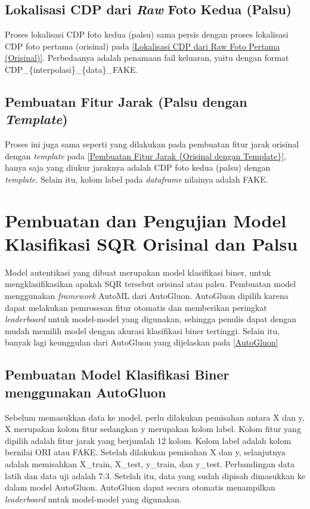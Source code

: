 \subsection{Lokalisasi CDP dari \emph{Raw} Foto Kedua (Palsu)} Proses lokalisasi CDP foto kedua (palsu) sama persis dengan proses lokalisasi CDP foto pertama (orisinal) pada \ref{Lokalisasi CDP dari Raw
	Foto Pertama (Orisinal)}. Perbedaanya adalah penamaan fail keluaran, yaitu dengan format CDP\_\{interpolasi\}\_\{data\}\_FAKE.

\subsection{Pembuatan Fitur Jarak (Palsu dengan \emph{Template})}
Proses ini juga sama seperti yang dilakukan pada pembuatan fitur jarak orisinal dengan \emph{template} pada \ref{Pembuatan Fitur Jarak {Orisinal dengan
			Template}}, hanya saja yang diukur jaraknya adalah CDP foto kedua (palsu) dengan \emph{template}. Selain itu, kolom label pada \emph{dataframe} nilainya adalah
FAKE.

\section{Pembuatan dan Pengujian Model Klasifikasi SQR Orisinal dan Palsu}
Model autentikasi yang dibuat merupakan model klasifikasi biner, untuk mengklasifikasikan apakah SQR tersebut orisinal atau palsu. Pembuatan model menggunakan
\emph{framework} AutoML dari AutoGluon. AutoGluon dipilih karena dapat melakukan pemrosesan fitur otomatis dan memberikan peringkat \emph{leaderboard} untuk
model-model yang digunakan, sehingga penulis dapat dengan mudah memilih model dengan akurasi klasifikasi biner tertinggi. Selain itu, banyak lagi keunggulan
dari AutoGluon yang dijelaskan pada \ref{AutoGluon}

\subsection{Pembuatan Model Klasifikasi Biner menggunakan AutoGluon}
Sebelum memasukkan data ke model, perlu dilakukan pemisahan antara X dan y, X merupakan kolom fitur sedangkan y merupakan kolom label. Kolom fitur yang dipilih
adalah fitur jarak yang berjumlah 12 kolom. Kolom label adalah kolom bernilai ORI atau FAKE. Setelah dilakukan pemisahan X dan y, selanjutnya adalah memisahkan
X\_train, X\_test, y\_train, dan y\_test. Perbandingan data latih dan data uji adalah 7:3. Setelah itu, data yang sudah dipisah dimasukkan ke dalam model
AutoGluon. AutoGluon dapat secara otomatis menampilkan \emph{leaderboard} untuk model-model yang digunakan.

